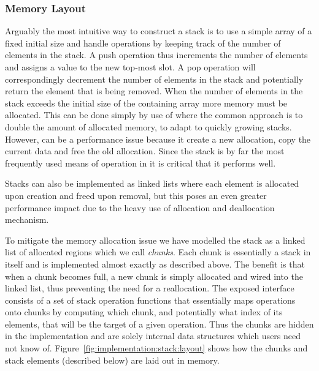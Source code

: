 \subsubsection{Memory Layout}

Arguably the most intuitive way to construct a stack is to use a simple array of
a fixed initial size and handle operations by keeping track of the number of
elements in the stack. A push operation thus increments the number of elements
and assigns a value to the new top-most slot. A pop operation will
correspondingly decrement the number of elements in the stack and potentially
return the element that is being removed. When the number of elements in the
stack exceeds the initial size of the containing array more memory must be
allocated. This can be done simply by use of  where the common
approach is to double the amount of allocated memory, to adapt to quickly
growing stacks. However,  can be a performance issue because it
create a new allocation, copy the current data and free the old
allocation\cite{man-realloc}. Since the stack is by far the most frequently used
means of operation in \thename{} it is critical that it performs well.

\begin{remark}
  Stacks can also be implemented as linked lists where each element is allocated
  upon creation and freed upon removal, but this poses an even greater
  performance impact due to the heavy use of allocation and deallocation
  mechanism.
\end{remark}

To mitigate the memory allocation issue we have modelled the stack as a linked
list of allocated regions which we call \textit{chunks}. Each chunk is
essentially a stack in itself and is implemented almost exactly as described
above. The benefit is that when a chunk becomes full, a new chunk is simply
allocated and wired into the linked list, thus preventing the need for a
reallocation. The exposed interface consists of a set of stack operation
functions that essentially maps operations onto chunks by computing which chunk,
and potentially what index of its elements, that will be the target of a given
operation. Thus the chunks are hidden in the implementation and are solely
internal data structures which users need not know
of. Figure~\ref{fig:implementation:stack:layout} shows how the chunks and stack
elements (described below) are laid out in memory.

